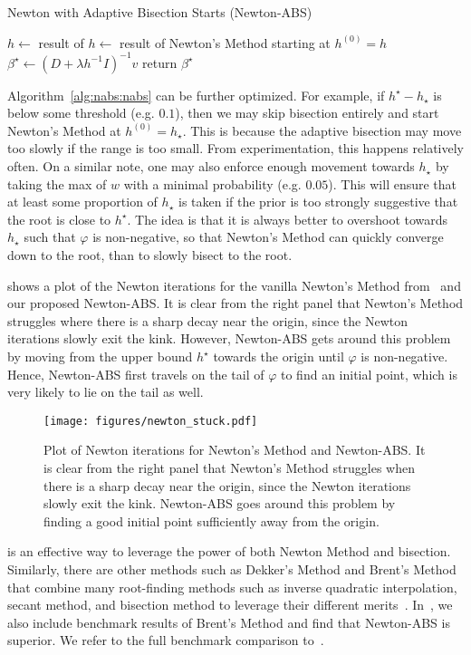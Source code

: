 \begin{algorithm}[t]
    \caption{Newton with Adaptive Bisection Starts (Newton-ABS)}\label{alg:nabs:nabs}
    $h \gets$ result of \;
     {
        $h \gets$ result of Newton's Method starting at $h^{(0)} = h$\;
    }
    $\beta^\star \gets (D + \lambda h^{-1} I)^{-1} v$\;
    return $\beta^\star$\;
\end{algorithm}

Algorithm~\ref{alg:nabs:nabs} can be further optimized.
For example, if $h^\star - h_\star$ is below some threshold (e.g. $0.1$),
then we may skip bisection entirely and start Newton's Method at $h^{(0)} = h_\star$.
This is because the adaptive bisection may move too slowly if the range is too small.
From experimentation, this happens relatively often.
On a similar note, one may also enforce enough movement towards $h_\star$
by taking the max of $w$ with a minimal probability (e.g. $0.05$).
This will ensure that at least some proportion of $h_\star$ is taken 
if the prior is too strongly suggestive that the root is close to $h^\star$.
The idea is that it is always better to overshoot towards $h_\star$ such that $\varphi$ is non-negative,
so that Newton's Method can quickly converge down to the root,
than to slowly bisect to the root.

 shows a plot of the Newton iterations for 
the vanilla Newton's Method from~ and our proposed Newton-ABS.
It is clear from the right panel that Newton's Method struggles 
where there is a sharp decay near the origin, since the Newton iterations
slowly exit the kink.
However, Newton-ABS gets around this problem by moving from the upper bound $h^\star$
towards the origin until $\varphi$ is non-negative.
Hence, Newton-ABS first travels on the tail of $\varphi$ to find an initial point,
which is very likely to lie on the tail as well.

\begin{figure}[t]
    \centering 
    \texttt{[image: figures/newton\_stuck.pdf]}
    \caption{Plot of Newton iterations for Newton's Method and Newton-ABS.
        It is clear from the right panel that Newton's Method struggles 
        when there is a sharp decay near the origin, since the Newton iterations
        slowly exit the kink.
        Newton-ABS goes around this problem by finding a good initial point
        sufficiently away from the origin.
    }
    \label{fig:newton-abs:stuck}
\end{figure}

 is an effective way to leverage the power of both Newton Method and bisection.
Similarly, there are other methods such as Dekker's Method and Brent's Method
that combine many root-finding methods such as inverse quadratic interpolation,
secant method, and bisection method to leverage their different merits~\citep{brent:2013,dekker:1969}.
In~,
we also include benchmark results of Brent's Method
and find that Newton-ABS is superior. 
We refer to the full benchmark comparison to~.
